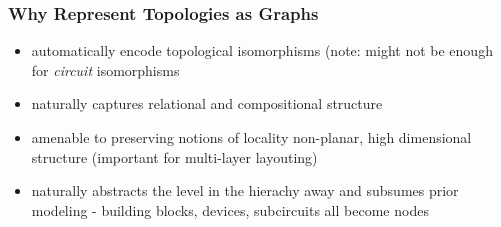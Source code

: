 \documentclass[./presentation.tex]{subfiles}
\begin{document}
\begin{frame}[label=working,c]
\begin{columns}
\begin{column}{0.5\textwidth}
{\begin{itemize}
{        }
     \end{itemize}
   }
  \end{column}%
  \begin{column}{0.5\textwidth}
  \centering
  \end{column}
\end{columns}
\end{frame}

\begin{frame}[label=working]
\frametitle{Why Represent Topologies as Graphs}
\begin{itemize}
  \item automatically encode topological isomorphisms (note: might not be enough for \emph{circuit} isomorphisms \cite{wangFunctionalityMattersNetlist2022c}
  \item naturally captures relational and compositional structure
  \item amenable to preserving notions of locality non-planar, high dimensional structure (important for multi-layer layouting)
  \item naturally abstracts the level in the hierachy away and subsumes prior modeling - building blocks, devices, subcircuits all become nodes
\end{itemize}
\end{frame}
\fi
\end{document}

